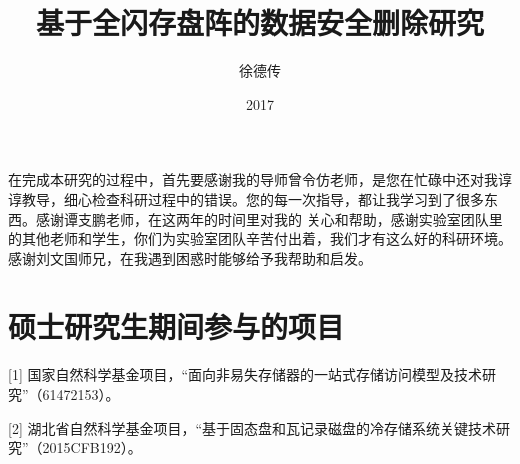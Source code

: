 \documentclass[format=draft,degree=master,language=chinese]{hustthesis}
\title{基于全闪存盘阵的数据安全删除研究}{Research on Secure Data Deletion of SSD-based Disk Array}
\author{徐德传}{Dechuan Xu}
\date{2017}{5}{27}
\begin{document}
\frontmatter
\maketitle
\makeabstract
\tableofcontents
\listoffigures
\listoftables
\mainmatter






%


\backmatter

\begin{ack}
    在完成本研究的过程中，首先要感谢我的导师曾令仿老师，是您在忙碌中还对我谆谆教导，细心检查科研过程中的错误。您的每一次指导，都让我学习到了很多东西。感谢谭支鹏老师，在这两年的时间里对我的
关心和帮助，感谢实验室团队里的其他老师和学生，你们为实验室团队辛苦付出着，我们才有这么好的科研环境。感谢刘文国师兄，在我遇到困惑时能够给予我帮助和启发。
\end{ack}




\appendix
\renewcommand{\thechapter}{\arabic{chapter}}
\chapter{硕士研究生期间参与的项目}
    [1] 国家自然科学基金项目，“面向非易失存储器的一站式存储访问模型及技术研究”（61472153）。


    [2] 湖北省自然科学基金项目，“基于固态盘和瓦记录磁盘的冷存储系统关键技术研究”（2015CFB192）。
\end{document}
